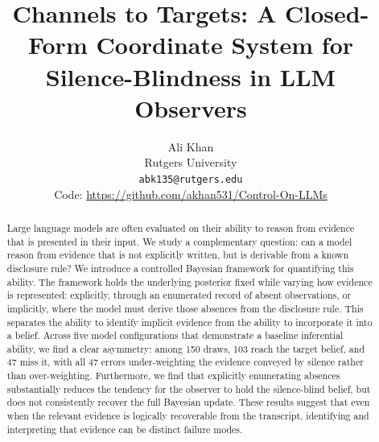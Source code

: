 \documentclass{article}
\author{%
  Ali Khan \\
  Rutgers University \\
  \texttt{abk135@rutgers.edu} \\[2pt]
  Code: \url{https://github.com/akhan531/Control-On-LLMs}
}
\title{Channels to Targets: A Closed-Form Coordinate System for
Silence-Blindness in LLM Observers}
\theoremstyle{plain}
\theoremstyle{definition}
\theoremstyle{remark}
\begin{document}
\maketitle

\begin{abstract}
Large language models are often evaluated on their ability to reason from
evidence that is presented in their input. We study a complementary question:
can a model reason from evidence that is not explicitly written, but is derivable
from a known disclosure rule? We introduce a controlled Bayesian framework for
quantifying this ability. The framework holds the underlying posterior fixed
while varying how evidence is represented: explicitly, through an enumerated
record of absent observations, or implicitly, where the model must derive those
absences from the disclosure rule. This separates the ability to identify
implicit evidence from the ability to incorporate it into a belief. Across five
model configurations that demonstrate a baseline inferential ability, we find a
clear asymmetry: among 150 draws, 103 reach the target belief, and 47 miss it,
with all 47 errors under-weighting the evidence conveyed by silence rather than
over-weighting. Furthermore, we find that explicitly enumerating absences
substantially reduces the tendency for the observer to hold the silence-blind belief, but does
not consistently recover the full Bayesian update. These results suggest that even
when the relevant evidence is logically recoverable from the transcript,
identifying and interpreting that evidence can be distinct failure modes.
\end{abstract}
\end{document}
